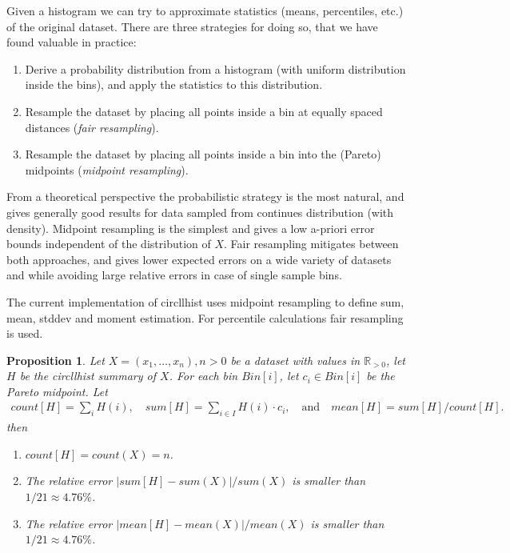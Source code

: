 \documentclass{article}
\theoremstyle{plain}
\newtheorem{proposition}[definition]{Proposition}
\theoremstyle{remark}
\newcommand{\IR}{\mathbb{R}}
\newcommand{\qtext}[1]{\quad\text{#1}\quad} %
\begin{document}
Given a histogram we can try to approximate statistics (means, percentiles, etc.) of the original dataset.
There are three strategies for doing so, that we have found valuable in practice:

\begin{enumerate}
\item Derive a probability distribution from a histogram (with uniform distribution inside the
  bins), and apply the statistics to this distribution.
\item Resample the dataset by placing all points inside a bin at equally spaced distances ({\it fair resampling}).
\item Resample the dataset by placing all points inside a bin into the (Pareto) midpoints ({\it midpoint resampling}).
\end{enumerate}

From a theoretical perspective the probabilistic strategy is the most natural, and gives generally
good results for data sampled from continues distribution (with density).  Midpoint resampling is
the simplest and gives a low a-priori error bounds independent of the distribution of $X$.  Fair
resampling mitigates between both approaches, and gives lower expected errors on a wide variety of
datasets and while avoiding large relative errors in case of single sample bins.

The current implementation of circllhist uses midpoint resampling to define sum, mean, stddev and
moment estimation. For percentile calculations fair resampling is used.

\begin{proposition}
  Let $X=(x_1,\dots,x_n), n>0$ be a dataset with values in $\IR_{>0}$, let $H$ be the circllhist summary of $X$.
  For each bin $Bin[i]$, let $c_i \in Bin[i]$ be the Pareto midpoint. Let
  \begin{align*}
    count[H] = \sum_i H(i), \quad sum[H] = \sum_{i\in I} H(i) \cdot c_i, \qtext{and} mean[H] = sum[H] / count[H].
  \end{align*}
  then
  \begin{enumerate}
  \item $count[H] = count(X) = n$.
  \item The relative error $|sum[H] - sum(X)| / sum(X)$ is smaller than $1/21 \approx 4.76\%$.
  \item The relative error $|mean[H] - mean(X)| / mean(X)$ is smaller than $1/21 \approx 4.76\%$.
  \end{enumerate}
\end{proposition}
\end{document}
